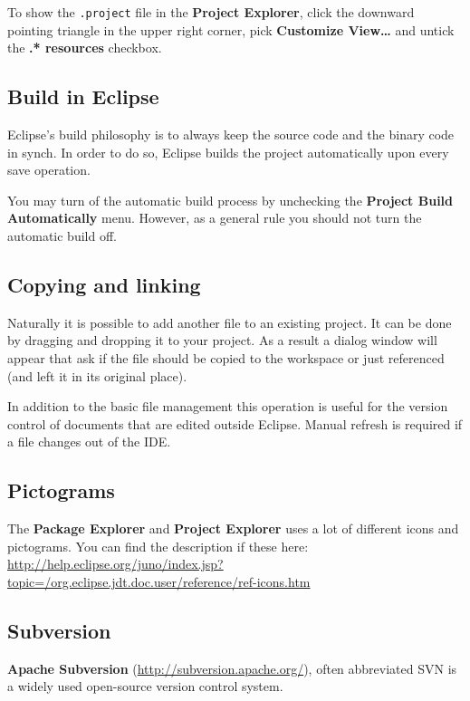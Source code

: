 \documentclass[]{report}
\begin{document}
To show the \texttt{.project} file in the \textbf{Project Explorer},
click the downward pointing triangle in the upper right corner, pick
\textbf{Customize View\ldots{}} and untick the \textbf{.* resources}
checkbox.

\subsection{Build in Eclipse}

Eclipse's build philosophy is to always keep the source code and the
binary code in synch. In order to do so, Eclipse builds the project
automatically upon every save operation.

You may turn of the automatic build process by unchecking the
\textbf{Project \textbar{} Build Automatically} menu. However, as a
general rule you should not turn the automatic build off.

\subsection{Copying and linking}

Naturally it is possible to add another file to an existing project. It
can be done by dragging and dropping it to your project. As a result a
dialog window will appear that ask if the file should be copied to the
workspace or just referenced (and left it in its original place).

In addition to the basic file management this operation is useful for
the version control of documents that are edited outside Eclipse. Manual
refresh is required if a file changes out of the IDE.

\subsection{Pictograms}

The \textbf{Package Explorer} and \textbf{Project Explorer} uses a lot
of different icons and pictograms. You can find the description if these
here:
\url{http://help.eclipse.org/juno/index.jsp?topic=/org.eclipse.jdt.doc.user/reference/ref-icons.htm}

\subsection{Subversion}

\textbf{Apache Subversion} (\url{http://subversion.apache.org/}), often
abbreviated SVN is a widely used open-source version control system.
\end{document}
